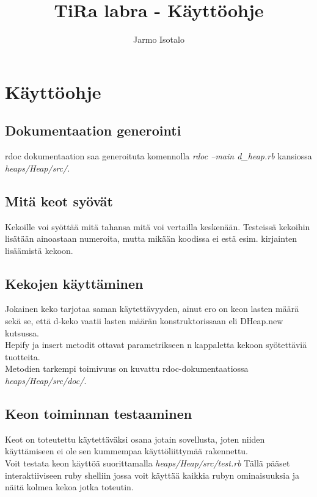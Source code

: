 \documentclass[a4paper,12pt]{article}
\begin{document}
\title{TiRa labra - Käyttöohje} 
\author{Jarmo Isotalo}
\maketitle

\section{Käyttöohje}
\subsection{Dokumentaation generointi}
rdoc dokumentaation saa generoituta komennolla \emph{rdoc --main d\_heap.rb} kansiossa  \emph{heaps/Heap/src/}.

\subsection{Mitä keot syövät}
Kekoille voi syöttää mitä tahansa mitä voi vertailla keskenään. Testeissä kekoihin lisätään ainoastaan numeroita, mutta mikään koodissa ei estä esim. kirjainten lisäämistä kekoon.


\subsection{Kekojen käyttäminen}
Jokainen keko tarjotaa saman käytettävyyden, ainut ero on keon lasten määrä sekä se, että d-keko vaatii lasten määrän konstruktorissaan eli DHeap.new kutsussa.\\


Hepify ja insert metodit ottavat parametrikseen n kappaletta kekoon syötettäviä tuotteita.\\

Metodien tarkempi toimivuus on kuvattu rdoc-dokumentaatiossa \emph{heaps/Heap/src/doc/}.

\subsection{Keon toiminnan testaaminen}
Keot on toteutettu käytettäväksi osana jotain sovellusta, joten niiden käyttämiseen ei ole sen kummempaa käyttöliittymää rakennettu.\\

Voit testata keon käyttöä suorittamalla \emph{heaps/Heap/src/test.rb} Tällä pääset interaktiiviseen ruby shelliin jossa voit käyttää kaikkia rubyn ominaisuuksia ja näitä kolmea kekoa jotka toteutin. \\
\end{document}
